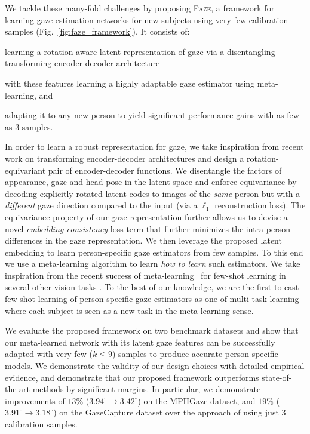 \documentclass[10pt,twocolumn,letterpaper]{article}
\newcommand{\faze}[0]{\textsc{Faze}\xspace}
\begin{document}
We tackle these many-fold challenges by proposing \faze, a framework for learning gaze estimation networks for new subjects using very few calibration samples (Fig.~\ref{fig:faze_framework}).
It consists of:
\begin{inparaenum}[i)]
\item learning a rotation-aware latent representation of gaze via a disentangling transforming encoder-decoder architecture 
\item with these features learning a highly adaptable gaze estimator using meta-learning, and 
\item adapting it to any new person to yield significant performance gains with as few as $3$ samples.
\end{inparaenum}


In order to learn a robust representation for gaze, we take inspiration from recent work on transforming encoder-decoder architectures \cite{Hinton2011ICANN,Worrall2017ICCV} and design a rotation-equivariant pair of encoder-decoder functions. 
We disentangle the factors of appearance, gaze and head pose in the latent space and enforce equivariance by decoding explicitly rotated latent codes to images of the \emph{same} person but with a \emph{different} gaze direction compared to the input (via a $\ell_1$ reconstruction loss).
The equivariance property of our gaze representation further allows us to devise a novel \emph{embedding consistency} loss term that further minimizes the intra-person differences in the gaze representation. 
We then leverage the proposed latent embedding to learn person-specific gaze estimators from few samples. To this end we use a meta-learning algorithm to learn \emph{how to learn} such estimators. We take inspiration from the recent success of meta-learning~\cite{andrychowicz2016learning} for few-shot learning in several other vision tasks \cite{Finn2017ICML, gui2018few, park2018meta}. To the best of our knowledge, we are the first to cast few-shot learning of person-specific gaze estimators as one of  multi-task learning where each subject is seen as a new task in the meta-learning sense.

We evaluate the proposed framework on two benchmark datasets and show that our meta-learned network with its latent gaze features can be successfully adapted with very few ($k\leq9$) samples to produce accurate person-specific models. We demonstrate the validity of our design choices with detailed empirical evidence, and demonstrate that our proposed framework outperforms state-of-the-art methods by significant margins.   
In particular, we demonstrate improvements of $13\%$ ($3.94^\circ\rightarrow 3.42^\circ$) on the MPIIGaze dataset, and $19\%$ ($3.91^\circ\rightarrow 3.18^\circ$) on the GazeCapture dataset over the approach of \cite{Liu2018BMVC} using just $3$ calibration samples.
\end{document}
